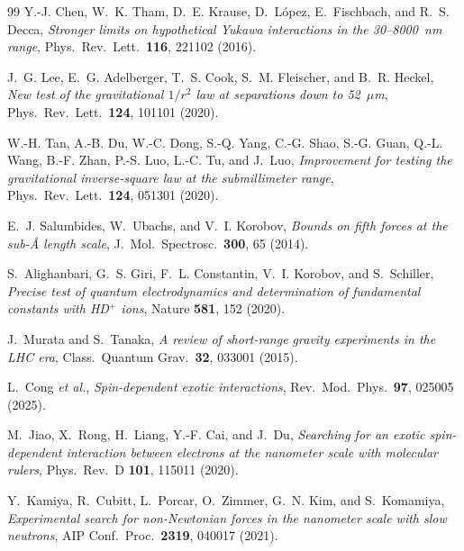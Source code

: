 \documentclass[main]{subfiles}
\begin{document}
{\begin{thebibliography}{99}
Y.-J. Chen, W.~K. Tham, D.~E. Krause, D.~L\'{o}pez, E.~Fischbach, and
R.~S. Decca,
\textit{Stronger limits on hypothetical Yukawa interactions in the
30--8000~nm range},
Phys.\ Rev.\ Lett.\ \textbf{116}, 221102 (2016).

J.~G. Lee, E.~G. Adelberger, T.~S. Cook, S.~M. Fleischer, and B.~R. Heckel,
\textit{New test of the gravitational $1/r^2$ law at separations down to
52~$\mu$m},
Phys.\ Rev.\ Lett.\ \textbf{124}, 101101 (2020).

W.-H. Tan, A.-B. Du, W.-C. Dong, S.-Q. Yang, C.-G. Shao, S.-G. Guan,
Q.-L. Wang, B.-F. Zhan, P.-S. Luo, L.-C. Tu, and J.~Luo,
\textit{Improvement for testing the gravitational inverse-square law at
the submillimeter range},
Phys.\ Rev.\ Lett.\ \textbf{124}, 051301 (2020).

E.~J. Salumbides, W.~Ubachs, and V.~I. Korobov,
\textit{Bounds on fifth forces at the sub-\AA{} length scale},
J.\ Mol.\ Spectrosc.\ \textbf{300}, 65 (2014).

S.~Alighanbari, G.~S. Giri, F.~L. Constantin, V.~I. Korobov, and
S.~Schiller,
\textit{Precise test of quantum electrodynamics and determination of
fundamental constants with HD$^+$ ions},
Nature \textbf{581}, 152 (2020).

J.~Murata and S.~Tanaka,
\textit{A review of short-range gravity experiments in the LHC era},
Class.\ Quantum Grav.\ \textbf{32}, 033001 (2015).

L.~Cong \textit{et al.},
\textit{Spin-dependent exotic interactions},
Rev.\ Mod.\ Phys.\ \textbf{97}, 025005 (2025).

M.~Jiao, X.~Rong, H.~Liang, Y.-F. Cai, and J.~Du,
\textit{Searching for an exotic spin-dependent interaction between
electrons at the nanometer scale with molecular rulers},
Phys.\ Rev.\ D \textbf{101}, 115011 (2020).

Y.~Kamiya, R.~Cubitt, L.~Porcar, O.~Zimmer, G.~N. Kim, and S.~Komamiya,
\textit{Experimental search for non-Newtonian forces in the nanometer
scale with slow neutrons},
AIP Conf.\ Proc.\ \textbf{2319}, 040017 (2021).

\end{thebibliography}
}{}
\end{document}
